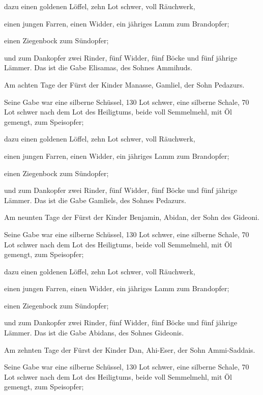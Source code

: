  dazu einen goldenen Löffel, zehn Lot schwer, voll
Räuchwerk,

 einen jungen Farren, einen Widder, ein jähriges Lamm zum
Brandopfer;

 einen Ziegenbock zum Sündopfer;

 und zum Dankopfer zwei Rinder, fünf Widder, fünf Böcke
und fünf jährige Lämmer. Das ist die Gabe Elisamas, des Sohnes Ammihuds.

 Am achten Tage der Fürst der Kinder Manasse, Gamliel,
der Sohn Pedazurs.

 Seine Gabe war eine silberne Schüssel, 130 Lot schwer,
eine silberne Schale, 70 Lot schwer nach dem Lot des Heiligtums, beide
voll Semmelmehl, mit Öl gemengt, zum Speisopfer;

 dazu einen goldenen Löffel, zehn Lot schwer, voll
Räuchwerk,

 einen jungen Farren, einen Widder, ein jähriges Lamm zum
Brandopfer;

 einen Ziegenbock zum Sündopfer;

 und zum Dankopfer zwei Rinder, fünf Widder, fünf Böcke
und fünf jährige Lämmer. Das ist die Gabe Gamliels, des Sohnes Pedazurs.

 Am neunten Tage der Fürst der Kinder Benjamin, Abidan,
der Sohn des Gideoni.

 Seine Gabe war eine silberne Schüssel, 130 Lot schwer,
eine silberne Schale, 70 Lot schwer nach dem Lot des Heiligtums, beide
voll Semmelmehl, mit Öl gemengt, zum Speisopfer;

 dazu einen goldenen Löffel, zehn Lot schwer, voll
Räuchwerk,

 einen jungen Farren, einen Widder, ein jähriges Lamm zum
Brandopfer;

 einen Ziegenbock zum Sündopfer;

 und zum Dankopfer zwei Rinder, fünf Widder, fünf Böcke
und fünf jährige Lämmer. Das ist die Gabe Abidans, des Sohnes Gideonis.

 Am zehnten Tage der Fürst der Kinder Dan, Ahi-Eser, der
Sohn Ammi-Saddais.

 Seine Gabe war eine silberne Schüssel, 130 Lot schwer,
eine silberne Schale, 70 Lot schwer nach dem Lot des Heiligtums, beide
voll Semmelmehl, mit Öl gemengt, zum Speisopfer;

